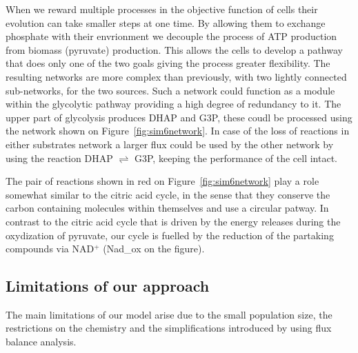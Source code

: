 \documentclass[a4paper,12pt]{article}
\begin{document}



When we reward multiple processes in the objective function of cells their evolution can take smaller steps at one time. By allowing them to exchange phosphate with their envrionment we decouple the process of ATP production from biomass (pyruvate) production. This allows the cells to develop a pathway that does only one of the two goals giving the process greater flexibility. The resulting networks are more complex than previously, with two lightly connected sub-networks, for the two sources. Such a network could function as a module within the glycolytic pathway providing a high degree of redundancy to it. The upper part of glycolysis produces DHAP and G3P, these coudl be processed using the network shown on Figure~\ref{fig:sim6network}. In case of the loss of reactions in either substrates network a larger flux could be used by the other network by using the reaction DHAP $\rightleftharpoons$ G3P, keeping the performance of the cell intact. 

The pair of reactions shown in red on Figure~\ref{fig:sim6network} play  a role somewhat similar to the 
citric acid cycle, in the sense that they conserve the carbon containing molecules within themselves and use a circular patway. In contrast to the citric acid cycle that is driven by the energy releases during the oxydization of pyruvate, our cycle is fuelled by the reduction of the partaking compounds via NAD$^+$ (Nad\_ox on the figure). 

\subsection{Limitations of our approach}
\label{sub:limitations}


The main limitations of our model arise due to the small population size, the restrictions on the chemistry and the simplifications introduced by using flux balance analysis. 
\end{document}
